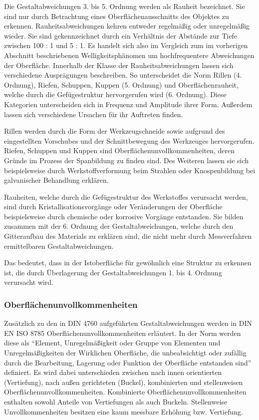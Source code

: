 Die Gestaltabweichungen 3. bis 5. Ordnung werden als Rauheit bezeichnet. Sie sind nur durch Betrachtung eines Oberflächenausschnitts des Objektes zu erkennen. Rauheitsabweichungen kehren entweder regelmäßig oder unregelmäßig wieder. Sie sind gekennzeichnet durch ein Verhältnis der Abstände zur Tiefe zwischen 100 : 1 und 5 : 1. Es handelt sich also im Vergleich zum im vorherigen Abschnitt beschriebenen Welligkeitsphänomen um hochfrequentere Abweichungen der Oberfläche. 
Innerhalb der Klasse der Rauheitsabweichungen lassen sich verschiedene Ausprägungen beschreiben. So unterscheidet die Norm Rillen (4. Ordnung), Riefen, Schuppen, Kuppen (5. Ordnung) und Oberflächenrauheit, welche durch die Gefügestruktur hervorgerufen wird (6. Ordnung).
Diese Kategorien unterscheiden sich in Frequenz und Amplitude ihrer Form. Außerdem lassen sich verschiedene Ursachen für ihr Auftreten finden. 

Rillen werden durch die Form der Werkzeugschneide sowie aufgrund des eingestellten Vorschubes und der Schnittbewegung des Werkzeuges hervorgerufen.
Riefen, Schuppen und Kuppen sind Oberflächenunvollkommenheiten, deren Gründe im Prozess der Spanbildung zu finden sind. Des Weiteren lassen sie sich beispielsweise durch Werkstoffverformung beim Strahlen oder Knospenbildung bei galvanischer Behandlung erklären. 

Rauheiten, welche durch die Gefügestruktur des Werkstoffes verursacht werden, sind durch Kristallisationsvorgänge oder Veränderungen der Oberfläche beispielsweise durch chemische oder korrosive Vorgänge entstanden. Sie bilden zusammen mit der 6. Ordnung der Gestaltabweichungen, welche durch den Gitteraufbau des Materials zu erklären sind, die nicht mehr durch Messverfahren ermittelbaren Gestaltabweichungen. 

Das bedeutet, dass in der Istoberfläche für gewöhnlich eine Struktur zu erkennen ist, die durch Überlagerung der Gestaltabweichungen 1. bis 4. Ordnung verursacht wird. 

\subsubsection{Oberflächenunvollkommenheiten}

Zusätzlich zu den in DIN 4760 aufgeführten Gestaltabweichungen werden in DIN EN ISO 8785 Oberflächenunvollkommenheiten erläutert. In der Norm werden diese als "`Element, Unregelmäßigkeit oder Gruppe von Elementen und Unregelmäßigkeiten der Wirklichen Oberfläche, die unbeabsichtigt oder zufällig durch die Bearbeitung, Lagerung oder Funktion der Oberfläche entstanden sind"' definiert. Es wird dabei unterschieden zwischen nach innen orientierten (Vertiefung), nach außen gerichteten (Buckel), kombinierten und stellenweisen Oberflächenunvollkommenheiten. Kombinierte Oberflächenunvollkommenheiten enthalten sowohl Anteile von Vertiefungen als auch Buckeln. Stellenweise Unvollkommenheiten besitzen eine kaum messbare Erhöhung bzw. Vertiefung. 

